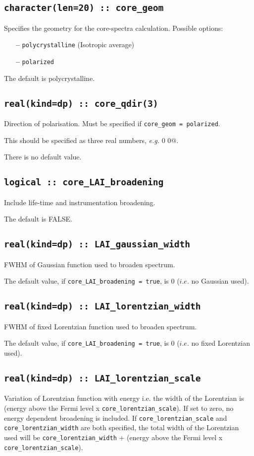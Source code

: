 \documentclass[a4paper,11pt,twoside]{book}
\begin{document}
{\subsection[core\_geom]{\tt character(len=20) :: core\_geom}

Specifies the geometry for the core-spectra calculation.  Possible options:
\begin{itemize}
\item[{\bf --}]  \verb#polycrystalline# (Isotropic average)
\item[{\bf --}]  \verb#polarized#
\end{itemize}
The default is polycrystalline.

\subsection[core\_qdir]{\tt real(kind=dp) :: core\_qdir(3)}
Direction of polarisation. Must be specified if \verb#core_geom = polarized#.

This should be specified as three real numbers, \emph{e.g.}  0 0@.

There is no default value.

\subsection[core\_LAI\_broadening]{\tt logical :: core\_LAI\_broadening}
Include life-time and instrumentation broadening.

The default is FALSE.

\subsection[core\_gaussian\_width]{\tt real(kind=dp) :: LAI\_gaussian\_width}
FWHM of Gaussian function used to broaden spectrum.

The default value, if \verb#core_LAI_broadening = true#, is 0 ($i.e.$ no Gaussian used).

\subsection[core\_lorentzian\_width]{\tt real(kind=dp) :: LAI\_lorentzian\_width}
FWHM of fixed Lorentzian function used to broaden spectrum.

The default value, if \verb#core_LAI_broadening = true#, is 0 ($i.e.$ no fixed Lorentzian used).

\subsection[core\_lorentzian\_scale]{\tt real(kind=dp) :: LAI\_lorentzian\_scale}
Variation of Lorentzian function with energy i.e. the width of the Lorentzian is (energy above the Fermi level x
\verb#core_lorentzian_scale#).  If set to zero, no energy dependent broadening is included.
If \verb#core_lorentzian_scale# and \verb#core_lorentzian_width# are both specified, the
total width of the Lorentzian used will be \verb#core_lorentzian_width# + (energy above the Fermi level x
\verb#core_lorentzian_scale#).

}
\end{document}
